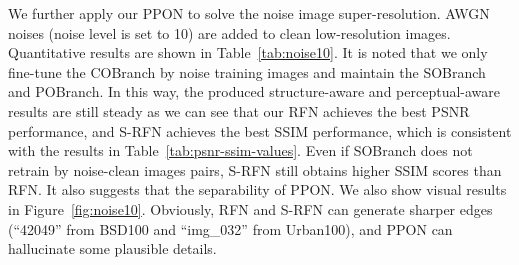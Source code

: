 \documentclass[preprint]{elsarticle}
\begin{document}
We further apply our PPON to solve the noise image super-resolution. AWGN noises (noise level is set to 10) are added to clean low-resolution images. Quantitative results are shown in Table~\ref{tab:noise10}. It is noted that we only fine-tune the COBranch by noise training images and maintain the SOBranch and POBranch. In this way, the produced structure-aware and perceptual-aware results are still steady as we can see that our RFN achieves the best PSNR performance, and S-RFN achieves the best SSIM performance, which is consistent with the results in Table~\ref{tab:psnr-ssim-values}. Even if SOBranch does not retrain by noise-clean images pairs, S-RFN still obtains higher SSIM scores than RFN. It also suggests that the separability of PPON. We also show visual results in Figure~\ref{fig:noise10}. Obviously, RFN and S-RFN can generate sharper edges (``42049'' from BSD100 and ``img\_032'' from Urban100), and PPON can hallucinate some plausible details.
\end{document}
